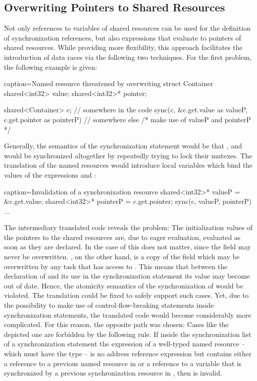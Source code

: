\subsection{Overwriting Pointers to Shared Resources}
\label{overwriting_shared_pointers}
Not only references to variables of shared resources can be used for the definition of synchronization references, but also expressions that evaluate to pointers of shared resources. While providing more flexibility, this approach facilitates the introduction of data races via the following two techniques. For the first problem, the following example is given:
\begin{ccode}{caption=Named resource threatened by overwriting}
struct Container {
  shared<int32> value;
  shared<int32>* pointer;
}

shared<Container> c;                                          // somewhere in the code
sync(c, &c.get.value as valueP, c.get.pointer as pointerP) {  // somewhere else
  /* make use of valueP and pointerP */
}
\end{ccode}
Generally, the semantics of the synchronization statement would be that ,  and  would be synchronized altogether by repeatedly trying to lock their mutexes. The translation of the named resources would introduce local variables which bind the values of the expressions  and :
\begin{ccode}{caption=Invalidation of a synchronization resource}
shared<int32>* valueP = &c.get.value;
shared<int32>* pointerP = c.get.pointer;
sync(c, valueP, pointerP) {...}
\end{ccode}
The intermediary translated code reveals the problem: The initialization values of the pointers to the shared resources are, due to eager evaluation, evaluated as soon as they are declared. In the case of  this does not matter, since the  field may never be overwritten. , on the other hand, is a copy of the field  which may be overwritten by any task that has access to . This means that between the declaration of  and its use in the synchronization statement its value may become out of date. Hence, the atomicity semantics of the synchronization of  would be violated. The translation could be fixed to safely support such cases. Yet, due to the possibility to make use of control-flow-breaking statements inside synchronization statements, the translated code would become considerably more complicated. For this reason, the opposite path was chosen: Cases like the depicted one are forbidden by the following rule. If inside the synchronization list  of a synchronization statement the expression of a well-typed named resource  -- which must have the type  -- is no address reference expression  but contains either a reference to a previous named resource in  or a reference to a variable that is synchronized by a previous synchronization resource in , then  is invalid.

